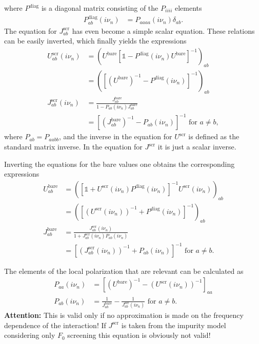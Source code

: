\documentclass[12pt,a4paper]{scrartcl}
\numberwithin{equation}{section}
\newcommand{\unity}{\mathds{1}}
\begin{document}
where $P^{\mathrm{diag}}$ is a diagonal matrix consisting of the $P_{iiii}$ elements 
\begin{align}
 P^{\mathrm{diag}}_{ab}(i\nu_n) &=  P_{aaaa}(i\nu_n) \delta_{ab}.
\end{align}
The equation for $J^{\mathrm{scr}}_{ab}$ has even become a simple scalar equation.
These relations can be easily inverted, which finally yields the expressions
\begin{align}
 U^{\mathrm{scr}}_{ab}(i\nu_n) 
 &= \left( U^{\mathrm{bare}} \left[\unity -  P^{\mathrm{diag}}(i\nu_n) U^{\mathrm{bare}} \right]^{-1} \right)_{ab} \\
 &=  \left( \left[ \left(U^{\mathrm{bare}}\right)^{-1} -  P^{\mathrm{diag}}(i\nu_n) \right]^{-1} \right)_{ab} \\
 J^{\mathrm{scr}}_{ab}(i\nu_n) 
 &= \frac{ J^{\mathrm{bare}}_{ab} }{ 1 - P_{ab}(i\nu_n)J^{\mathrm{bare}}_{ab} }  \\
 &= \left[  \left(J^{\mathrm{bare}}_{ab} \right)^{-1} - P_{ab}(i\nu_n) \right]^{-1} \mbox{ for } a\neq b,
\end{align}
where  $P_{ab} = P_{aabb}$, and the inverse in the equation for $U^{\mathrm{scr}}$
is defined as the standard matrix inverse. In the equation for $J^{\mathrm{scr}}$ it is just 
a scalar inverse.

Inverting the equations for the bare values one obtains the corresponding expressions
\begin{align}
 U^{\mathrm{bare}}_{ab}
 &= \left( \left[\unity + U^{\mathrm{scr}}(i\nu_n) P^{\mathrm{diag}}(i\nu_n) \right]^{-1} U^{\mathrm{scr}}(i\nu_n) \right)_{ab} \\
 &=  \left( \left[ \left(U^{\mathrm{scr}}(i\nu_n)\right)^{-1} +  P^{\mathrm{diag}}(i\nu_n) \right]^{-1} \right)_{ab} \\
 J^{\mathrm{bare}}_{ab} 
 &= \frac{ J^{\mathrm{scr}}_{ab}(i\nu_n) }{ 1 + J^{\mathrm{scr}}_{ab}(i\nu_n) P_{ab}(i\nu_n) } \\
 &= \left[  \left(J^{\mathrm{scr}}_{ab}(i\nu_n) \right)^{-1} + P_{ab}(i\nu_n) \right]^{-1} \mbox{ for } a\neq b.
\end{align}

The elements of the local polarization that are relevant can be 
calculated as
\begin{align}
 P_{aa}(i\nu_n)  
 &= \left[ \left(U^{\mathrm{bare}}\right)^{-1} - \left(U^{\mathrm{scr}}(i\nu_n)\right)^{-1} \right]_{aa} \\
%
 P_{ab}(i\nu_n) 
 &= \frac{1}{J^{\mathrm{bare}}_{ab}} - \frac{1}{J^{\mathrm{scr}}_{ab}(i\nu_n)} \mbox{ for } a\neq b.
\end{align}
\textbf{Attention:} This is valid only if no approximation is made on the frequency dependence
of the interaction! If $J^{\mathrm{scr}}$ is taken from the impurity model
considering only $F_0$ screening this equation is obviously not valid!
\end{document}
